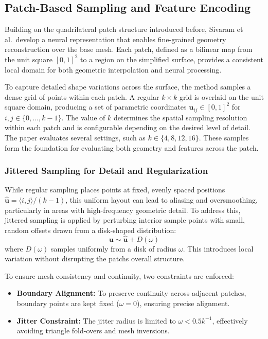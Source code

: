 \subsection{Patch-Based Sampling and Feature Encoding}

Building on the quadrilateral patch structure introduced before, Sivaram et al.\ develop a neural representation that enables fine-grained geometry reconstruction over the base mesh.  
Each patch, defined as a bilinear map from the unit square $[0,1]^2$ to a region on the simplified surface, provides a consistent local domain for both geometric interpolation and neural processing.  

To capture detailed shape variations across the surface, the method samples a dense grid of points within each patch.  
A regular $k \times k$ grid is overlaid on the unit square domain, producing a set of parametric coordinates $\mathbf{u}_{ij} \in [0,1]^2$ for $i,j \in \{0, \ldots, k - 1\}$.  
The value of $k$ determines the spatial sampling resolution within each patch and is configurable depending on the desired level of detail.  
The paper evaluates several settings, such as $k \in \{4, 8, 12, 16\}$.  
These samples form the foundation for evaluating both geometry and features across the patch.

\subsubsection{Jittered Sampling for Detail and Regularization}

While regular sampling places points at fixed, evenly spaced positions $\hat{\mathbf{u}} = \langle i, j \rangle / (k - 1)$, this uniform layout can lead to aliasing and oversmoothing, particularly in areas with high-frequency geometric detail.  
To address this, jittered sampling is applied by perturbing interior sample points with small, random offsets drawn from a disk-shaped distribution:  
\[
\mathbf{u} \sim \hat{\mathbf{u}} + D(\omega)
\]  
where $D(\omega)$ samples uniformly from a disk of radius $\omega$.  
This introduces local variation without disrupting the patchs overall structure.  

To ensure mesh consistency and continuity, two constraints are enforced:  
\begin{itemize}
  \item \textbf{Boundary Alignment:} To preserve continuity across adjacent patches, boundary points are kept fixed ($\omega = 0$), ensuring precise alignment.  
  \item \textbf{Jitter Constraint:} The jitter radius is limited to $\omega < 0.5k^{-1}$, effectively avoiding triangle fold-overs and mesh inversions.  
\end{itemize}

